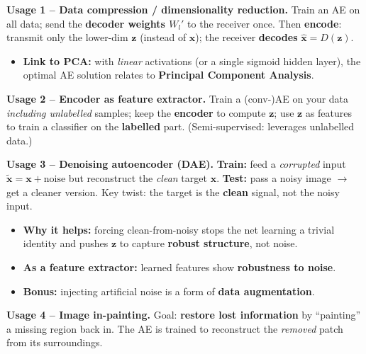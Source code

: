\documentclass[10pt,a4paper]{article}
\begin{document}
	\begin{importantbox}
		\textbf{Usage 1 -- Data compression / dimensionality reduction.} Train an AE on all data; send the \textbf{decoder weights $W_l'$} to the receiver once. Then \textbf{encode}: transmit only the lower-dim $\mathbf{z}$ (instead of $\mathbf{x}$); the receiver \textbf{decodes} $\hat{\mathbf{x}} = D(\mathbf{z})$.
	\end{importantbox}

	\begin{itemize}[leftmargin=*]
		\item \textbf{Link to PCA:} with \emph{linear} activations (or a single sigmoid hidden layer), the optimal AE solution relates to \textbf{Principal Component Analysis}.
	\end{itemize}

	\begin{importantbox}
		\textbf{Usage 2 -- Encoder as feature extractor.} Train a (conv-)AE on your data \emph{including unlabelled} samples; keep the \textbf{encoder} to compute $\mathbf{z}$; use $\mathbf{z}$ as features to train a classifier on the \textbf{labelled} part. (Semi-supervised: leverages unlabelled data.)
	\end{importantbox}

	\begin{importantbox}
		\textbf{Usage 3 -- Denoising autoencoder (DAE).} \textbf{Train:} feed a \emph{corrupted} input $\tilde{\mathbf{x}} = \mathbf{x} + \text{noise}$ but reconstruct the \emph{clean} target $\mathbf{x}$. \textbf{Test:} pass a noisy image $\to$ get a cleaner version. Key twist: the target is the \textbf{clean} signal, not the noisy input.
	\end{importantbox}

	\begin{itemize}[leftmargin=*]
		\item \textbf{Why it helps:} forcing clean-from-noisy stops the net learning a trivial identity and pushes $\mathbf{z}$ to capture \textbf{robust structure}, not noise.
		\item \textbf{As a feature extractor:} learned features show \textbf{robustness to noise}.
		\item \textbf{Bonus:} injecting artificial noise is a form of \textbf{data augmentation}.
	\end{itemize}

	\begin{importantbox}
		\textbf{Usage 4 -- Image in-painting.} Goal: \textbf{restore lost information} by ``painting'' a missing region back in. The AE is trained to reconstruct the \emph{removed} patch from its surroundings.
	\end{importantbox}
\end{document}
